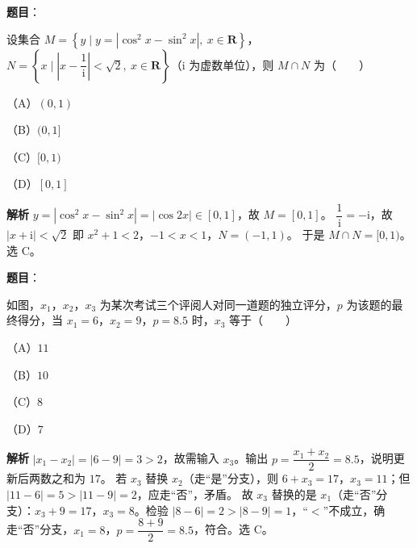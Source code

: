 \begin{answer}

\textbf{题目}：

设集合 $M=\left\{y\mid y=|\cos^2x-\sin^2x|,\ x\in\mathbf R\right\}$，$N=\left\{x\mid\left|x-\dfrac1{\mathrm i}\right|<\sqrt2,\ x\in\mathbf R\right\}$（$\mathrm i$ 为虚数单位），则 $M\cap N$ 为\mbox{（　　）}

（A）$(0,1)$

（B）$(0,1]$

（C）$[0,1)$

（D）$[0,1]$

\textbf{解析}
$y=|\cos^2x-\sin^2x|=|\cos2x|\in[0,1]$，故 $M=[0,1]$。
$\dfrac1{\mathrm i}=-\mathrm i$，故 $|x+\mathrm i|<\sqrt2$ 即 $x^2+1<2$，$-1<x<1$，$N=(-1,1)$。
于是 $M\cap N=[0,1)$。选 C。


\end{answer}
\begin{answer}

\textbf{题目}：

如图，$x_1$，$x_2$，$x_3$ 为某次考试三个评阅人对同一道题的独立评分，$p$ 为该题的最终得分，当 $x_1=6$，$x_2=9$，$p=8.5$ 时，$x_3$ 等于\mbox{（　　）}

（A）$11$

（B）$10$

（C）$8$

（D）$7$
\nopagebreak[4]
\begin{center}\end{center}
\nopagebreak[4]
\textbf{解析}
$|x_1-x_2|=|6-9|=3>2$，故需输入 $x_3$。输出 $p=\dfrac{x_1+x_2}2=8.5$，说明更新后两数之和为 $17$。
若 $x_3$ 替换 $x_2$（走“是”分支），则 $6+x_3=17$，$x_3=11$；但 $|11-6|=5>|11-9|=2$，应走“否”，矛盾。
故 $x_3$ 替换的是 $x_1$（走“否”分支）：$x_3+9=17$，$x_3=8$。检验 $|8-6|=2>|8-9|=1$，“$<$”不成立，确走“否”分支，$x_1=8$，$p=\dfrac{8+9}2=8.5$，符合。选 C。


\end{answer}

